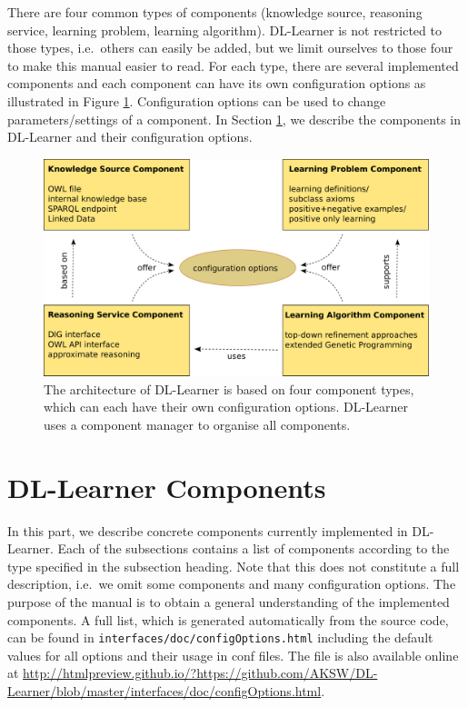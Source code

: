 \documentclass[a4paper,12pt]{scrartcl}
\begin{document}
There are four common types of components (knowledge source, reasoning service, learning problem, learning algorithm). DL-Learner is not restricted to those types, i.e.~others can easily be added, but we limit ourselves to those four to make this manual easier to read. For each type, there are several implemented components and each component can have its own configuration options as illustrated in Figure \ref{fig:components}. Configuration options can be used to change parameters/settings of a component. In Section \ref{sec:components}, we describe the components in DL-Learner and their configuration options.

\begin{figure}
 \includegraphics[width=\textwidth]{components_print.pdf}
 \caption{The architecture of DL-Learner is based on four component types, which can each have their own configuration options. DL-Learner uses a component manager to organise all components.}
 \label{fig:components}
\end{figure}

\section{DL-Learner Components}
\label{sec:components}

In this part, we describe concrete components currently implemented in DL-Learner. Each of the subsections contains a list of components according to the type specified in the subsection heading. Note that this does not constitute a full description, i.e.~we omit some components and many configuration options. The purpose of the manual is to obtain a general understanding of the implemented components. A full list, which is generated automatically from the source code, can be found in \verb|interfaces/doc/configOptions.html| including the default values for all options and their usage in conf files. The file is also available online at \url{http://htmlpreview.github.io/?https://github.com/AKSW/DL-Learner/blob/master/interfaces/doc/configOptions.html}.
\end{document}
